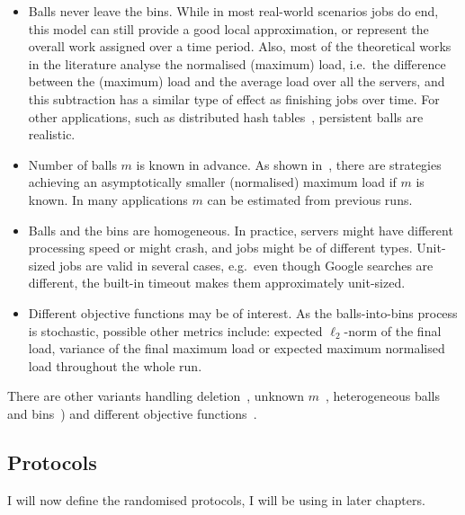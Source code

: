 \begin{itemize}
    \item
    Balls never leave the bins. While in most real-world scenarios jobs do end, this model can still provide a good local approximation, or represent the overall work assigned over a time period. Also, most of the theoretical works in the literature analyse the normalised (maximum) load, i.e.\ the difference between the (maximum) load and the average load over all the servers, and this subtraction has a similar type of effect as finishing jobs over time. For other applications, such as distributed hash tables~\cite{wieder2017ballsintobinslandscape}, persistent balls are realistic. 
    \item
    Number of balls $m$ is known in advance. As shown in~\cite{feldheim2021longtermthinning}, there are strategies achieving an asymptotically smaller (normalised) maximum load if $m$ is known. In many applications $m$ can be estimated from previous runs.
    \item
    Balls and the bins are homogeneous. In practice, servers might have different processing speed or might crash, and jobs might be of different types. Unit-sized jobs are valid in several cases, e.g.\ even though Google searches are different, the built-in timeout makes them approximately unit-sized.
    
    
    \item
    Different objective functions may be of interest. As the balls-into-bins process is stochastic, possible other metrics include: expected $\ell_2$-norm of the final load, variance of the final maximum load or expected maximum normalised load throughout the whole run.
\end{itemize}


There are other variants handling deletion~\cite{azar1999twochoice}, unknown $m$~\cite{feldheim2021longtermthinning}, heterogeneous balls and bins~\cite{berenbrink2008weighted}) and different objective functions~\cite{feldheim2021longtermthinning}.


\subsection{Protocols} \label{protocols}

I will now define the randomised protocols, I will be using in later chapters.

